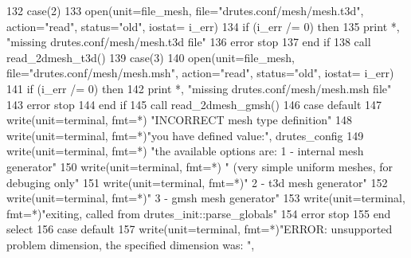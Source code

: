 \begin{DoxyCode}
132             \textcolor{keywordflow}{case}(2)
133               \textcolor{keyword}{open}(unit=file_mesh, file=\textcolor{stringliteral}{"drutes.conf/mesh/mesh.t3d"}, action=\textcolor{stringliteral}{"read"}\textcolor{comment}{, status=}\textcolor{stringliteral}{"old"}\textcolor{comment}{, iostat=
      i\_err)}
134 \textcolor{comment}{              }\textcolor{keywordflow}{if} (i\_err /= 0) \textcolor{keywordflow}{then}
135                 print *, \textcolor{stringliteral}{"missing drutes.conf/mesh/mesh.t3d file"}
136                 error stop
137 \textcolor{keywordflow}{              end if}
138               \textcolor{keyword}{call }read_2dmesh_t3d()
139             \textcolor{keywordflow}{case}(3)
140               \textcolor{keyword}{open}(unit=file_mesh, file=\textcolor{stringliteral}{"drutes.conf/mesh/mesh.msh"}, action=\textcolor{stringliteral}{"read"}\textcolor{comment}{, status=}\textcolor{stringliteral}{"old"}\textcolor{comment}{, iostat=
      i\_err)}
141 \textcolor{comment}{              }\textcolor{keywordflow}{if} (i\_err /= 0) \textcolor{keywordflow}{then}
142                 print *, \textcolor{stringliteral}{"missing drutes.conf/mesh/mesh.msh file"}
143                 error stop
144 \textcolor{keywordflow}{              end if}
145               \textcolor{keyword}{call }read_2dmesh_gmsh()
146 \textcolor{keywordflow}{            case default}
147               \textcolor{keyword}{write}(unit=terminal, fmt=*) \textcolor{stringliteral}{"INCORRECT mesh type definition"}
148               \textcolor{keyword}{write}(unit=terminal, fmt=*)\textcolor{stringliteral}{"you have defined value:"}, 
      drutes_config%
149               \textcolor{keyword}{write}(unit=terminal, fmt=*) \textcolor{stringliteral}{"the available options are: 1 - internal mesh generator"}\textcolor{comment}{ }
150 \textcolor{comment}{              }\textcolor{keyword}{write}(unit=terminal, fmt=*) \textcolor{stringliteral}{"   (very simple uniform meshes, for debuging only"}
151               \textcolor{keyword}{write}(unit=terminal, fmt=*)\textcolor{stringliteral}{"                           2 - t3d mesh generator"}
152               \textcolor{keyword}{write}(unit=terminal, fmt=*)\textcolor{stringliteral}{"                           3 - gmsh mesh generator"}
153               \textcolor{keyword}{write}(unit=terminal, fmt=*)\textcolor{stringliteral}{"exiting, called from drutes\_init::parse\_globals"}
154               error stop
155 \textcolor{keywordflow}{           end select}
156 \textcolor{keywordflow}{        case default}
157           \textcolor{keyword}{write}(unit=terminal, fmt=*)\textcolor{stringliteral}{"ERROR: unsupported problem dimension, the specified dimension was: "}\textcolor{comment}{,
}
\end{DoxyCode}
